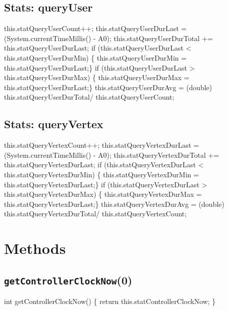 \subsection{Stats: queryUser}
\nwenddocs{}\endmoddef{}
    this.statQueryUserCount++;
    this.statQueryUserDurLast = (System.currentTimeMillis() - A0);
    this.statQueryUserDurTotal +=
    this.statQueryUserDurLast;
if (this.statQueryUserDurLast <
    this.statQueryUserDurMin) \{
    this.statQueryUserDurMin =
    this.statQueryUserDurLast;\}
if (this.statQueryUserDurLast >
    this.statQueryUserDurMax) \{
    this.statQueryUserDurMax =
    this.statQueryUserDurLast;\}
    this.statQueryUserDurAvg = (double)
    this.statQueryUserDurTotal/
    this.statQueryUserCount;
\nwendcode{}\nwdocspar

\subsection{Stats: queryVertex}
\nwenddocs{}\endmoddef{}
    this.statQueryVertexCount++;
    this.statQueryVertexDurLast = (System.currentTimeMillis() - A0);
    this.statQueryVertexDurTotal +=
    this.statQueryVertexDurLast;
if (this.statQueryVertexDurLast <
    this.statQueryVertexDurMin) \{
    this.statQueryVertexDurMin =
    this.statQueryVertexDurLast;\}
if (this.statQueryVertexDurLast >
    this.statQueryVertexDurMax) \{
    this.statQueryVertexDurMax =
    this.statQueryVertexDurLast;\}
    this.statQueryVertexDurAvg = (double)
    this.statQueryVertexDurTotal/
    this.statQueryVertexCount;
\nwendcode{}\nwdocspar

\section{Methods}

\subsection{\texttt{getControllerClockNow}(0)}
\nwenddocs{}\endmoddef{}
int    getControllerClockNow() \{
  return this.statControllerClockNow;
\}
\eatline
{}\nwendcode{}\nwdocspar
